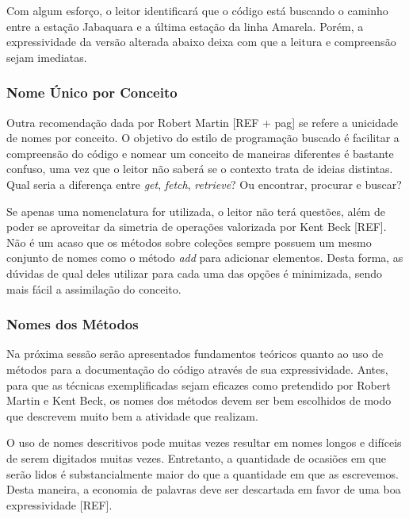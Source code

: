 

Com algum esforço, o leitor identificará que o código está buscando o caminho entre a estação Jabaquara e a última estação da linha Amarela. Porém, a expressividade da versão alterada abaixo deixa com que a leitura e compreensão sejam imediatas.




\subsubsection{Nome Único por Conceito}
Outra recomendação dada por Robert Martin [REF + pag] se refere a unicidade de nomes por conceito. O objetivo do estilo de programação buscado é facilitar a compreensão do código e nomear um conceito de maneiras diferentes é bastante confuso, uma vez que o leitor não saberá se o contexto trata de ideias distintas. Qual seria a diferença entre \textit{get}, \textit{fetch}, \textit{retrieve}? Ou encontrar, procurar e buscar?
	
Se apenas uma nomenclatura for utilizada, o leitor não terá questões, além de poder se aproveitar da simetria de operações valorizada por Kent Beck [REF]. Não é um acaso que os métodos sobre coleções sempre possuem um mesmo conjunto de nomes como o método \textit{add} para adicionar elementos. Desta forma, as dúvidas de qual deles utilizar para cada uma das opções é minimizada, sendo mais fácil a assimilação do conceito.

\subsubsection{Nomes dos Métodos}
Na próxima sessão serão apresentados fundamentos teóricos quanto ao uso de métodos para a documentação do código através de sua expressividade. Antes, para que as técnicas exemplificadas sejam eficazes como pretendido por Robert Martin e Kent Beck, os nomes dos métodos devem ser bem escolhidos de modo que descrevem muito bem a atividade que realizam.
	
O uso de nomes descritivos pode muitas vezes resultar em nomes longos e difíceis de serem digitados muitas vezes. Entretanto, a quantidade de ocasiões em que serão lidos é substancialmente maior do que a quantidade em que as escrevemos. Desta maneira, a economia de palavras deve ser descartada em favor de uma boa expressividade [REF].
	
